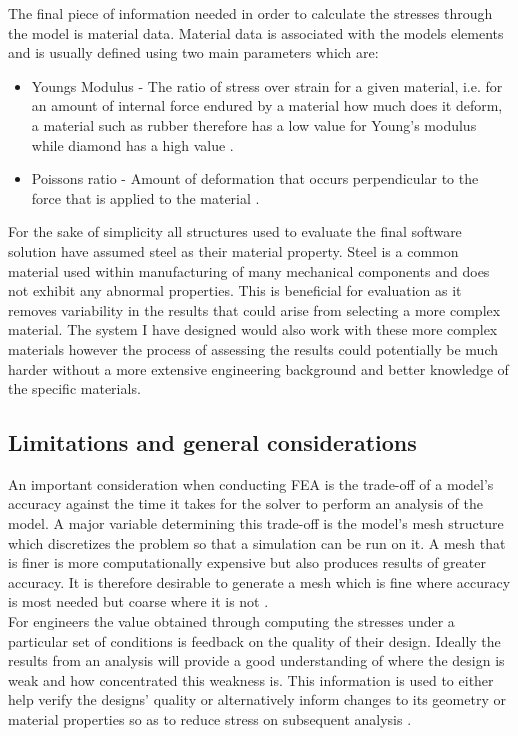 \noindent
The final piece of information needed in order to calculate the stresses through the model is material data. Material data is associated with the models elements and is usually defined using two main parameters which are:

\begin{itemize}
\item Youngs Modulus - The ratio of stress over strain for a given material, i.e. for an amount of internal force endured by a material how much does it deform, a material such as rubber therefore has a low value for Young's modulus while diamond has a high value \cite{YoungsModulus}.

\item Poissons ratio - Amount of deformation that occurs perpendicular to the force that is applied to the material \cite{PossionsRatio}. 
\end{itemize}

\noindent
For the sake of simplicity all structures used to evaluate the final software solution have assumed steel as their material property. Steel is a common material used within manufacturing of many mechanical components and does not exhibit any abnormal properties. This is beneficial for evaluation as it removes variability in the results that could arise from selecting a more complex material. The system I have designed would also work with these more complex materials however the process of assessing the results could potentially be much harder without a more extensive engineering background and better knowledge of the specific materials. 

\subsection{Limitations and general considerations}
\noindent
An important consideration when conducting FEA is the trade-off of a model's accuracy against the time it takes for the solver to perform an analysis of the model. A major variable determining this trade-off is the model's mesh structure which discretizes the problem so that a simulation can be run on it. A mesh that is finer is more computationally expensive but also produces results of greater accuracy. It is therefore desirable to generate a mesh which is fine where accuracy is most needed but coarse where it is not \cite{cite04}. \\


\noindent
For engineers the value obtained through computing the stresses under a particular set of conditions is feedback on the quality of their design. Ideally the results from an analysis will provide a good understanding of where the design is weak and how concentrated this weakness is. This information is used to either help verify the designs' quality or alternatively inform changes to its geometry or material properties so as to reduce stress on subsequent analysis \cite{cite06}.\\

